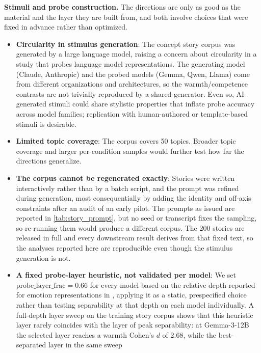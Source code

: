 \documentclass[twocolumn]{article}
\begin{document}
\begin{appendices}
\smallskip\noindent\textbf{Stimuli and probe construction.}
The directions are only as good as the material and the layer they are
built from, and both involve choices that were fixed in advance rather
than optimized.

\begin{itemize}[leftmargin=*, itemsep=2pt, topsep=4pt, parsep=0pt]
  \item \textbf{Circularity in stimulus generation}: The concept story
  corpus was generated by a large language model, raising a concern about
  circularity in a study that probes language model representations. The
  generating model (Claude, Anthropic) and the probed models (Gemma, Qwen,
  Llama) come from different organizations and architectures, so the
  warmth/competence contrasts are not trivially reproduced by a shared
  generator. Even so, AI-generated stimuli could share stylistic properties
  that inflate probe accuracy across model families; replication with
  human-authored or template-based stimuli is desirable.
  \item \textbf{Limited topic coverage}: The corpus covers 50 topics.
  Broader topic coverage and larger per-condition samples would further
  test how far the directions generalize.
  \item \textbf{The corpus cannot be regenerated exactly}: Stories were
  written interactively rather than by a batch script, and the prompt was
  refined during generation, most consequentially by adding the identity
  and off-axis constraints after an audit of an early pilot. The prompts as
  issued are reported in \autoref{tab:story_prompt}, but no seed or
  transcript fixes the sampling, so re-running them would produce a
  different corpus. The 200 stories are released in full and every
  downstream result derives from that fixed text, so the analyses reported
  here are reproducible even though the stimulus generation is not.
  \item \textbf{A fixed probe-layer heuristic, not validated per model}:
  We set $\mathrm{probe\_layer\_frac} = 0.66$ for every model based on the
  relative depth reported for emotion representations in
  \citet{sofroniew2026emotion}, applying it as a static, prespecified
  choice rather than testing separability at that depth on each model
  individually. A full-depth layer sweep on the training story corpus
  shows that this heuristic layer rarely coincides with the layer of peak
  separability: at Gemma-3-12B the selected layer reaches a warmth
  Cohen's $d$ of 2.68, while the best-separated layer in the same sweep

\end{itemize}
\end{appendices}
\end{document}
